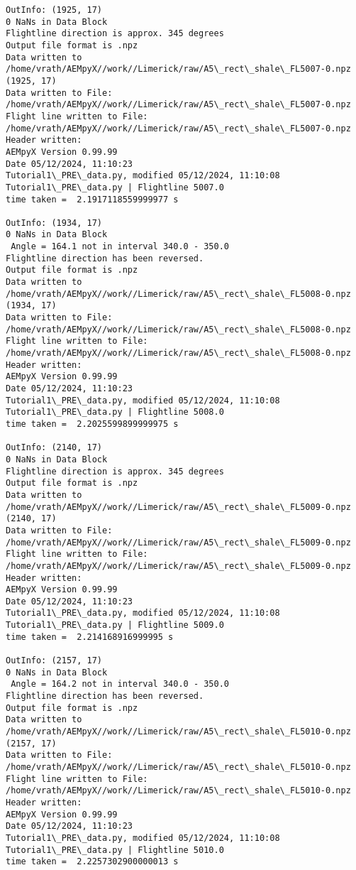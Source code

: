\documentclass[11pt]{article}
\begin{document}
\begin{Verbatim}[commandchars=\\\{\}]
OutInfo: (1925, 17)
0 NaNs in Data Block
Flightline direction is approx. 345 degrees
Output file format is .npz
Data written to
/home/vrath/AEMpyX//work//Limerick/raw/A5\_rect\_shale\_FL5007-0.npz
(1925, 17)
Data written to File:
/home/vrath/AEMpyX//work//Limerick/raw/A5\_rect\_shale\_FL5007-0.npz
Flight line written to File:
/home/vrath/AEMpyX//work//Limerick/raw/A5\_rect\_shale\_FL5007-0.npz
Header written:
AEMpyX Version 0.99.99
Date 05/12/2024, 11:10:23
Tutorial1\_PRE\_data.py, modified 05/12/2024, 11:10:08
Tutorial1\_PRE\_data.py | Flightline 5007.0
time taken =  2.1917118559999977 s

OutInfo: (1934, 17)
0 NaNs in Data Block
 Angle = 164.1 not in interval 340.0 - 350.0
Flightline direction has been reversed.
Output file format is .npz
Data written to
/home/vrath/AEMpyX//work//Limerick/raw/A5\_rect\_shale\_FL5008-0.npz
(1934, 17)
Data written to File:
/home/vrath/AEMpyX//work//Limerick/raw/A5\_rect\_shale\_FL5008-0.npz
Flight line written to File:
/home/vrath/AEMpyX//work//Limerick/raw/A5\_rect\_shale\_FL5008-0.npz
Header written:
AEMpyX Version 0.99.99
Date 05/12/2024, 11:10:23
Tutorial1\_PRE\_data.py, modified 05/12/2024, 11:10:08
Tutorial1\_PRE\_data.py | Flightline 5008.0
time taken =  2.2025599899999975 s

OutInfo: (2140, 17)
0 NaNs in Data Block
Flightline direction is approx. 345 degrees
Output file format is .npz
Data written to
/home/vrath/AEMpyX//work//Limerick/raw/A5\_rect\_shale\_FL5009-0.npz
(2140, 17)
Data written to File:
/home/vrath/AEMpyX//work//Limerick/raw/A5\_rect\_shale\_FL5009-0.npz
Flight line written to File:
/home/vrath/AEMpyX//work//Limerick/raw/A5\_rect\_shale\_FL5009-0.npz
Header written:
AEMpyX Version 0.99.99
Date 05/12/2024, 11:10:23
Tutorial1\_PRE\_data.py, modified 05/12/2024, 11:10:08
Tutorial1\_PRE\_data.py | Flightline 5009.0
time taken =  2.214168916999995 s

OutInfo: (2157, 17)
0 NaNs in Data Block
 Angle = 164.2 not in interval 340.0 - 350.0
Flightline direction has been reversed.
Output file format is .npz
Data written to
/home/vrath/AEMpyX//work//Limerick/raw/A5\_rect\_shale\_FL5010-0.npz
(2157, 17)
Data written to File:
/home/vrath/AEMpyX//work//Limerick/raw/A5\_rect\_shale\_FL5010-0.npz
Flight line written to File:
/home/vrath/AEMpyX//work//Limerick/raw/A5\_rect\_shale\_FL5010-0.npz
Header written:
AEMpyX Version 0.99.99
Date 05/12/2024, 11:10:23
Tutorial1\_PRE\_data.py, modified 05/12/2024, 11:10:08
Tutorial1\_PRE\_data.py | Flightline 5010.0
time taken =  2.2257302900000013 s


\end{Verbatim}
\end{document}

